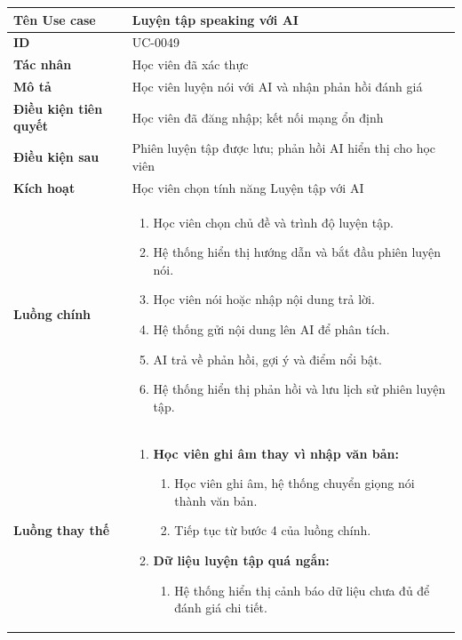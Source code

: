 {
\renewcommand{\arraystretch}{1.5}

\begin{tabularx}{\textwidth}{|>{\raggedright\arraybackslash}X|>{\raggedright\arraybackslash}X|}
\hline
\textbf{Tên Use case} & Luyện tập speaking với AI \\
\hline
\textbf{ID} & UC-0049 \\
\hline
\textbf{Tác nhân} & Học viên đã xác thực \\
\hline
\textbf{Mô tả} & Học viên luyện nói với AI và nhận phản hồi đánh giá \\
\hline
\textbf{Điều kiện tiên quyết} & Học viên đã đăng nhập; kết nối mạng ổn định \\
\hline
\textbf{Điều kiện sau} & Phiên luyện tập được lưu; phản hồi AI hiển thị cho học viên \\
\hline
\textbf{Kích hoạt} & Học viên chọn tính năng Luyện tập với AI \\
\hline
\textbf{Luồng chính} &
\begin{enumerate}
    \item Học viên chọn chủ đề và trình độ luyện tập.
    \item Hệ thống hiển thị hướng dẫn và bắt đầu phiên luyện nói.
    \item Học viên nói hoặc nhập nội dung trả lời.
    \item Hệ thống gửi nội dung lên AI để phân tích.
    \item AI trả về phản hồi, gợi ý và điểm nổi bật.
    \item Hệ thống hiển thị phản hồi và lưu lịch sử phiên luyện tập.
\end{enumerate} \\
\hline
\textbf{Luồng thay thế} &
\begin{enumerate}
    \item \textbf{Học viên ghi âm thay vì nhập văn bản:}
    \begin{enumerate}
        \item[3A.] Học viên ghi âm, hệ thống chuyển giọng nói thành văn bản.
        \item[4A.] Tiếp tục từ bước 4 của luồng chính.
    \end{enumerate}
    \item \textbf{Dữ liệu luyện tập quá ngắn:}
    \begin{enumerate}
        \item[5B.] Hệ thống hiển thị cảnh báo dữ liệu chưa đủ để đánh giá chi tiết.
    \end{enumerate}

\end{enumerate}
\end{tabularx}}
